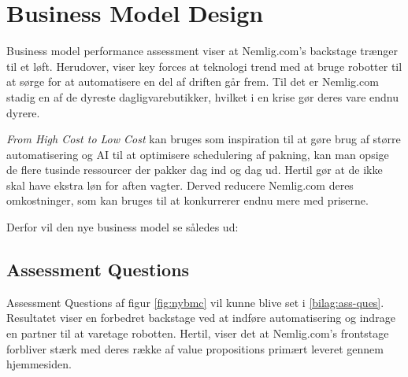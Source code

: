 \section{Business Model Design}
Business model performance assessment viser at Nemlig.com's backstage trænger til et løft. Herudover, viser key forces at teknologi trend med at bruge robotter til at sørge for at automatisere en del af driften går frem. Til det er Nemlig.com stadig en af de dyreste dagligvarebutikker, hvilket i en krise gør deres vare endnu dyrere. 

\textit{From High Cost to Low Cost} kan bruges som inspiration til at gøre brug af større automatisering og AI til at optimisere schedulering af pakning, kan man opsige de flere tusinde ressourcer der pakker dag ind og dag ud. Hertil gør at de ikke skal have ekstra løn for aften vagter. Derved reducere Nemlig.com deres omkostninger, som kan bruges til at konkurrerer endnu mere med priserne.

Derfor vil den nye business model se således ud:

\subsection{Assessment Questions}
Assessment Questions af figur \ref{fig:nybmc} vil kunne blive set i \autoref{bilag:ass-ques}. Resultatet viser en forbedret backstage ved at indføre automatisering og indrage en partner til at varetage robotten. Hertil, viser det at Nemlig.com's frontstage forbliver stærk med deres række af value propositions primært leveret gennem hjemmesiden.  